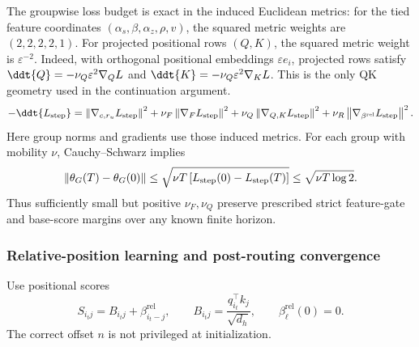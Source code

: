 The groupwise loss budget is exact in the induced Euclidean metrics:
for the tied feature coordinates $(\alpha_s,\beta,\alpha_z,\rho,v)$, the squared
metric weights are $(2,2,2,2,1)$. For projected positional rows $(Q,K)$,
the squared metric weight is $\varepsilon^{-2}$.
Indeed, with orthogonal positional embeddings $\varepsilon e_i$,
projected rows satisfy $\ddt{Q}=-\nu_Q\varepsilon^2\nabla_Q L$ and
$\ddt{K}=-\nu_Q\varepsilon^2\nabla_K L$. This is the only QK geometry
used in the continuation argument.
\begin{equation}\label{eq:lr-mobility-budget}
 -\ddt{\LRstep}=
 \LRnorm{\nabla_{c,r_u}\LRstep}^2
 +\nu_F\LRnorm{\nabla_F\LRstep}^2
 +\nu_Q\LRnorm{\nabla_{Q,K}\LRstep}^2
 +\nu_R\LRnorm{\nabla_{\beta^{\mathrm{rel}}}\LRstep}^2.
\end{equation}
Here group norms and gradients use those induced metrics. For each group
with mobility $\nu$, Cauchy--Schwarz implies
\begin{equation}\label{eq:lr-movement-budget}
 \left\lVert \theta_G(T)-\theta_G(0)\right\rVert
 \le\sqrt{\nu T\,[L_{\mathrm{step}}(0)-L_{\mathrm{step}}(T)]}
 \le\sqrt{\nu T\log2}.
\end{equation}
Thus sufficiently small but positive $\nu_F,\nu_Q$ preserve prescribed
strict feature-gate and base-score margins over any known finite horizon.


\subsubsection{Relative-position learning and post-routing convergence}
\label{app:weak-routing-convergence}

Use positional scores
\begin{equation}\label{eq:lr-relative-scores}
 S_{i_tj}=B_{i_tj}+\beta_{i_t-j}^{\mathrm{rel}},
 \qquad
 B_{i_tj}=\frac{q_{i_t}^\top k_j}{\sqrt{d_h}},
 \qquad \beta_\ell^{\mathrm{rel}}(0)=0.
\end{equation}
The correct offset $n$ is not privileged at initialization.

